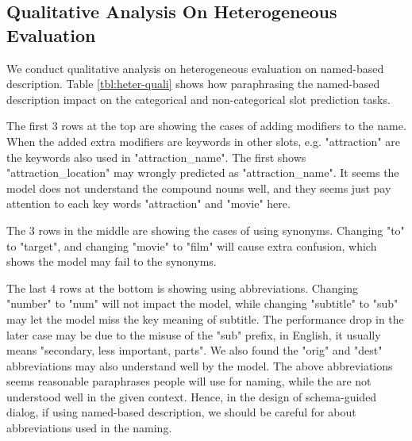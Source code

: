 \subsection{Qualitative Analysis On Heterogeneous Evaluation}
\label{ssec:qualitative-analysis}
We conduct qualitative analysis on heterogeneous evaluation on
named-based description. Table \ref{tbl:heter-quali} shows how paraphrasing the
named-based description impact on the categorical and non-categorical
slot prediction tasks.

The first 3 rows at the top are showing the cases of adding modifiers
to the name. When the added extra modifiers are keywords in other
slots, e.g. "attraction" are the keywords also used in
"attraction\_name". The first shows "attraction\_location" may wrongly
predicted as "attraction\_name". It seems the model does not understand
the compound nouns well, and they seems just pay attention to each key
words "attraction" and "movie" here.

The 3 rows in the middle are showing the cases of using
synonyms. Changing "to" to "target", and changing "movie" to "film" will
cause extra confusion, which shows the model may fail to the synonyms.

The last 4 rows at the bottom is showing using abbreviations. Changing
"number" to "num" will not impact the model, while changing "subtitle"
to "sub" may let the model miss the key meaning of subtitle.  The
performance drop in the later case may be due to the misuse of the
"sub" prefix, in English, it usually means "secondary, less important,
parts". We also found the "orig" and "dest" abbreviations may also
understand well by the model. The above abbreviations seems reasonable
paraphrases people will use for naming, while the are not understood
well in the given context. Hence, in the design of schema-guided
dialog, if using named-based description, we should be careful for
about abbreviations used in the naming.

